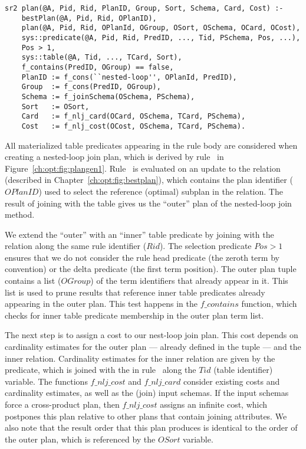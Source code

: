 \begin{figure*}
\ssp
\centering
\begin{lstlisting}
sr2 plan(@A, Pid, Rid, PlanID, Group, Sort, Schema, Card, Cost) :- 
    bestPlan(@A, Pid, Rid, OPlanID),
    plan(@A, Pid, Rid, OPlanId, OGroup, OSort, OSchema, OCard, OCost),
    sys::predicate(@A, Pid, Rid, PredID, ..., Tid, PSchema, Pos, ...),
    Pos > 1,
    sys::table(@A, Tid, ..., TCard, Sort),
    f_contains(PredID, OGroup) == false,
    PlanID := f_cons(``nested-loop'', OPlanId, PredID),
    Group  := f_cons(PredID, OGroup),
    Schema := f_joinSchema(OSchema, PSchema),
    Sort   := OSort,
    Card   := f_nlj_card(OCard, OSchema, TCard, PSchema),
    Cost   := f_nlj_cost(OCost, OSchema, TCard, PSchema).
\end{lstlisting}
\caption{\label{ch:opt:fig:plangen1}nested-loop join method.}
\end{figure*}

All materialized table predicates appearing in the rule body are considered when
creating a nested-loop join plan, which is derived by rule~ in
Figure~\ref{ch:opt:fig:plangen1}.  Rule~ is evaluated on an update to the
 relation (described in Chapter~\ref{ch:opt:fig:bestplan}), which
contains the plan identifier ($OPlanID$) used to select the reference (optimal)
subplan in the  relation.  The result of joining  with 
the  table gives us the ``outer'' plan of the nested-loop join method.

We extend the ``outer''  with an ``inner'' table predicate by joining
with the  relation along the same rule identifier ($Rid$).
The selection predicate $Pos > 1$ ensures that we do not consider the rule head
predicate (the zeroth term by convention) or the delta predicate (the first
term position).  The outer plan tuple contains a list ($OGroup$) of the term
identifiers that already appear in it.  This list is used to prune results that
reference inner table predicates already appearing in the outer plan.  This
test happens in the $f\_contains$ function, which checks for inner table
predicate membership in the outer plan term list.

The next step is to assign a cost to our nest-loop join plan.  This cost
depends on cardinality estimates for the outer plan --- already defined in the
 tuple --- and the inner relation.  Cardinality estimates for the inner
relation are given by the  predicate, which is joined with the
 in rule~ along the $Tid$ (table identifier)
variable.  The functions $f\_nlj\_cost$ and $f\_nlj\_card$ consider existing
costs and cardinality estimates, as well as the (join) input schemas.  If the
input schemas force a cross-product plan, then $f\_nlj\_cost$ assigns an
infinite cost, which postpones this plan relative to other plans that contain
joining attributes.  We also note that the result order that this plan produces
is identical to the order of the outer plan, which is referenced by the $OSort$
variable.

